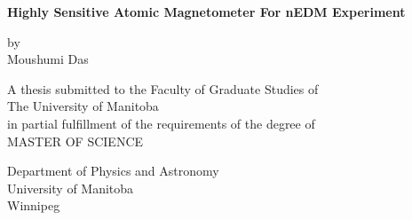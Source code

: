 \documentclass[12pt]{report}
\begin{document}
\begin{titlepage}
    \begin{center}
        \vspace*{0.5cm}
        
        {\large
        \textbf{Highly Sensitive Atomic Magnetometer For nEDM Experiment }
        }
        \vspace{0.5cm}
        {\large
        
        
        \vspace{1.5cm}
        by\\
        \vspace{0.9cm}
        Moushumi Das
        \vfill
        }
%
       \vspace{1.5cm}
       A thesis submitted to the Faculty of Graduate Studies of\\ The University of Manitoba\\
       in partial fulfillment of the requirements of the degree of\\
        \vspace{1.2cm}
        MASTER OF SCIENCE
        {\Large
        \vspace{0.8cm}
        
        \large
        Department of Physics and Astronomy\\
        University of Manitoba\\
        Winnipeg
  }
        
    \end{center}
\end{titlepage}
\end{document}
